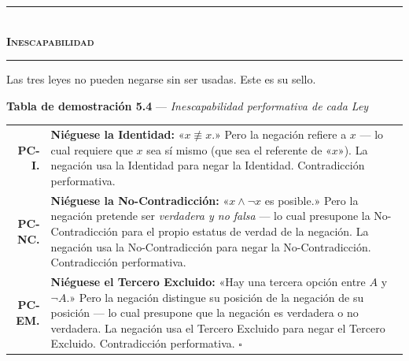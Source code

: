 \documentclass[10pt, openany, oneside]{book}
\renewcommand{\normalsize}{\fontsize{10}{13}\selectfont}
\renewcommand{\footnotesize}{\fontsize{8.5}{11}\selectfont}
\begin{document}
\vspace{1.5em}


\begin{center}
    \rule{0.3\textwidth}{0.4pt}\\[0.5em]
    {\normalsize\bfseries\scshape Inescapabilidad}\\[0.3em]
    \rule{0.3\textwidth}{0.4pt}
\end{center}

\vspace{1em}

\noindent Las tres leyes no pueden negarse sin ser usadas. Este es su sello.

\vspace{0.5em}

\textbf{Tabla de demostración 5.4} --- \textit{Inescapabilidad performativa de cada Ley}

\vspace{0.5em}

{\footnotesize
\noindent\begin{tabular}{r p{}}
\textbf{PC-I.} & \textbf{Niéguese la Identidad:} «$x \not\equiv x$.» Pero la negación refiere a $x$ --- lo cual requiere que $x$ sea sí mismo (que sea el referente de «$x$»). La negación usa la Identidad para negar la Identidad. Contradicción performativa. \\[0.3em]
\textbf{PC-NC.} & \textbf{Niéguese la No-Contradicción:} «$x \wedge \neg x$ es posible.» Pero la negación pretende ser \textit{verdadera y no falsa} --- lo cual presupone la No-Contradicción para el propio estatus de verdad de la negación. La negación usa la No-Contradicción para negar la No-Contradicción. Contradicción performativa. \\[0.3em]
\textbf{PC-EM.} & \textbf{Niéguese el Tercero Excluido:} «Hay una tercera opción entre $A$ y $\neg A$.» Pero la negación distingue su posición de la negación de su posición --- lo cual presupone que la negación es verdadera o no verdadera. La negación usa el Tercero Excluido para negar el Tercero Excluido. Contradicción performativa. $\square$ \\[0.3em]
\end{tabular}
}

\vspace{0.8em}
\end{document}
